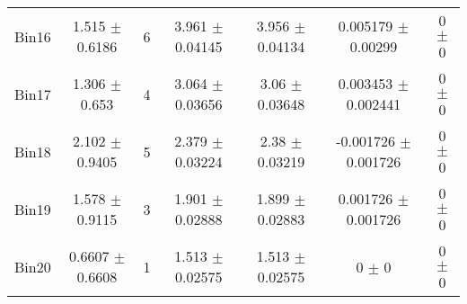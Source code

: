 \begin{tabular}{@{\extracolsep{4pt}}lcccccc@{}}
     Bin16 & 1.515 $\pm$ 0.6186 & 6 & 3.961 $\pm$ 0.04145 & 3.956 $\pm$ 0.04134 & 0.005179 $\pm$ 0.00299 & 0 $\pm$ 0 \\ 
     Bin17 & 1.306 $\pm$ 0.653 & 4 & 3.064 $\pm$ 0.03656 & 3.06 $\pm$ 0.03648 & 0.003453 $\pm$ 0.002441 & 0 $\pm$ 0 \\ 
     Bin18 & 2.102 $\pm$ 0.9405 & 5 & 2.379 $\pm$ 0.03224 & 2.38 $\pm$ 0.03219 & -0.001726 $\pm$ 0.001726 & 0 $\pm$ 0 \\ 
     Bin19 & 1.578 $\pm$ 0.9115 & 3 & 1.901 $\pm$ 0.02888 & 1.899 $\pm$ 0.02883 & 0.001726 $\pm$ 0.001726 & 0 $\pm$ 0 \\ 
     Bin20 & 0.6607 $\pm$ 0.6608 & 1 & 1.513 $\pm$ 0.02575 & 1.513 $\pm$ 0.02575 & 0 $\pm$ 0 & 0 $\pm$ 0 \\ 
\hline\hline
  \end{tabular}
